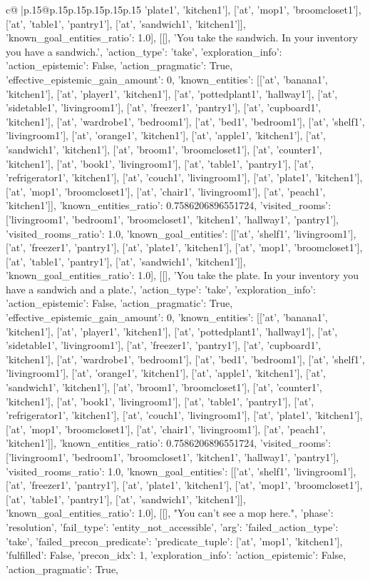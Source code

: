 \documentclass{article}
\begin{document}
{\begin{supertabular}{c@{$\;$}|p{.15\linewidth}@{}p{.15\linewidth}p{.15\linewidth}p{.15\linewidth}p{.15\linewidth}p{.15\linewidth}}
{{{'plate1', 'kitchen1'], ['at', 'mop1', 'broomcloset1'], ['at', 'table1', 'pantry1'], ['at', 'sandwich1', 'kitchen1']], 'known_goal_entities_ratio': 1.0}}], [[], 'You take the sandwich. In your inventory you have a sandwich.', {'action_type': 'take', 'exploration_info': {'action_epistemic': False, 'action_pragmatic': True, 'effective_epistemic_gain_amount': 0, 'known_entities': [['at', 'banana1', 'kitchen1'], ['at', 'player1', 'kitchen1'], ['at', 'pottedplant1', 'hallway1'], ['at', 'sidetable1', 'livingroom1'], ['at', 'freezer1', 'pantry1'], ['at', 'cupboard1', 'kitchen1'], ['at', 'wardrobe1', 'bedroom1'], ['at', 'bed1', 'bedroom1'], ['at', 'shelf1', 'livingroom1'], ['at', 'orange1', 'kitchen1'], ['at', 'apple1', 'kitchen1'], ['at', 'sandwich1', 'kitchen1'], ['at', 'broom1', 'broomcloset1'], ['at', 'counter1', 'kitchen1'], ['at', 'book1', 'livingroom1'], ['at', 'table1', 'pantry1'], ['at', 'refrigerator1', 'kitchen1'], ['at', 'couch1', 'livingroom1'], ['at', 'plate1', 'kitchen1'], ['at', 'mop1', 'broomcloset1'], ['at', 'chair1', 'livingroom1'], ['at', 'peach1', 'kitchen1']], 'known_entities_ratio': 0.7586206896551724, 'visited_rooms': ['livingroom1', 'bedroom1', 'broomcloset1', 'kitchen1', 'hallway1', 'pantry1'], 'visited_rooms_ratio': 1.0, 'known_goal_entities': [['at', 'shelf1', 'livingroom1'], ['at', 'freezer1', 'pantry1'], ['at', 'plate1', 'kitchen1'], ['at', 'mop1', 'broomcloset1'], ['at', 'table1', 'pantry1'], ['at', 'sandwich1', 'kitchen1']], 'known_goal_entities_ratio': 1.0}}], [[], 'You take the plate. In your inventory you have a sandwich and a plate.', {'action_type': 'take', 'exploration_info': {'action_epistemic': False, 'action_pragmatic': True, 'effective_epistemic_gain_amount': 0, 'known_entities': [['at', 'banana1', 'kitchen1'], ['at', 'player1', 'kitchen1'], ['at', 'pottedplant1', 'hallway1'], ['at', 'sidetable1', 'livingroom1'], ['at', 'freezer1', 'pantry1'], ['at', 'cupboard1', 'kitchen1'], ['at', 'wardrobe1', 'bedroom1'], ['at', 'bed1', 'bedroom1'], ['at', 'shelf1', 'livingroom1'], ['at', 'orange1', 'kitchen1'], ['at', 'apple1', 'kitchen1'], ['at', 'sandwich1', 'kitchen1'], ['at', 'broom1', 'broomcloset1'], ['at', 'counter1', 'kitchen1'], ['at', 'book1', 'livingroom1'], ['at', 'table1', 'pantry1'], ['at', 'refrigerator1', 'kitchen1'], ['at', 'couch1', 'livingroom1'], ['at', 'plate1', 'kitchen1'], ['at', 'mop1', 'broomcloset1'], ['at', 'chair1', 'livingroom1'], ['at', 'peach1', 'kitchen1']], 'known_entities_ratio': 0.7586206896551724, 'visited_rooms': ['livingroom1', 'bedroom1', 'broomcloset1', 'kitchen1', 'hallway1', 'pantry1'], 'visited_rooms_ratio': 1.0, 'known_goal_entities': [['at', 'shelf1', 'livingroom1'], ['at', 'freezer1', 'pantry1'], ['at', 'plate1', 'kitchen1'], ['at', 'mop1', 'broomcloset1'], ['at', 'table1', 'pantry1'], ['at', 'sandwich1', 'kitchen1']], 'known_goal_entities_ratio': 1.0}}], [[], "You can't see a mop here.", {'phase': 'resolution', 'fail_type': 'entity_not_accessible', 'arg': {'failed_action_type': 'take', 'failed_precon_predicate': {'predicate_tuple': ['at', 'mop1', 'kitchen1'], 'fulfilled': False, 'precon_idx': 1}}, 'exploration_info': {'action_epistemic': False, 'action_pragmatic': True, }}}
\end{supertabular}}
\end{document}
